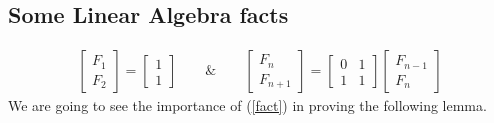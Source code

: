 \documentclass[paper=a4, fontsize=11pt,twoside]{scrartcl}		%
\theoremstyle{definition}
\theoremstyle{remark}
\begin{document}
\subsection{Some Linear Algebra facts}
\begin{align}\label{fact}
  \left[\begin{matrix} F_1\\ F_2 \end{matrix} \right] = \left[\begin{matrix} 1\\ 1\end{matrix}\right]
\qquad \& \qquad
\left[\begin{matrix} F_n\\ F_{n+1} \end{matrix}\right] = \left[ \begin{matrix} 0   & 1 \\ 1  & 1 \end{matrix}\right] \left[\begin{matrix} F_{n-1}\\ F_n \end{matrix}\right]
\end{align}
We are going to see the importance of (\ref{fact}) in proving the following lemma.
\end{document}
